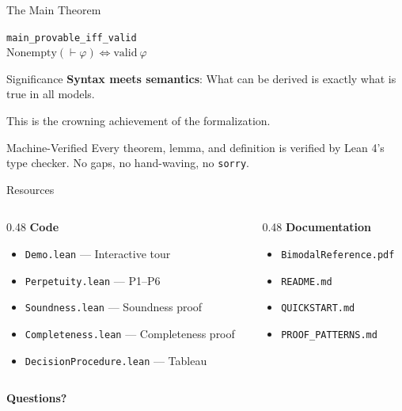 \documentclass[aspectratio=169,11pt]{beamer}
\newcommand{\proves}{\vdash}
\begin{document}
\begin{frame}{The Main Theorem}

\begin{center}
\Large
\texttt{main\_provable\_iff\_valid}\\[0.5cm]
$\text{Nonempty}(\proves \varphi) \Leftrightarrow \text{valid}~\varphi$
\end{center}

\vspace{0.5cm}

\begin{block}{Significance}
\textbf{Syntax meets semantics}: What can be derived is exactly what is true in all models.

This is the crowning achievement of the formalization.
\end{block}

\vspace{0.3cm}

\begin{alertblock}{Machine-Verified}
Every theorem, lemma, and definition is verified by Lean 4's type checker.
No gaps, no hand-waving, no \texttt{sorry}.
\end{alertblock}

\end{frame}

\begin{frame}{Resources}

\begin{columns}
\begin{column}{0.48\textwidth}
\textbf{Code}
\begin{itemize}
    \item \texttt{Demo.lean} --- Interactive tour
    \item \texttt{Perpetuity.lean} --- P1--P6
    \item \texttt{Soundness.lean} --- Soundness proof
    \item \texttt{Completeness.lean} --- Completeness proof
    \item \texttt{DecisionProcedure.lean} --- Tableau
\end{itemize}
\end{column}
\begin{column}{0.48\textwidth}
\textbf{Documentation}
\begin{itemize}
    \item \texttt{BimodalReference.pdf}
    \item \texttt{README.md}
    \item \texttt{QUICKSTART.md}
    \item \texttt{PROOF\_PATTERNS.md}
\end{itemize}
\end{column}
\end{columns}

\vspace{0.5cm}

\begin{center}
\Large\textbf{Questions?}
\end{center}

\end{frame}
\end{document}
